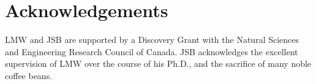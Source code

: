\section*{Acknowledgements}
{LMW and JSB are supported by a Discovery Grant with the Natural
  Sciences and Engineering Research Council of Canada. JSB acknowledges the excellent
  supervision of LMW over the course of his Ph.D., and the sacrifice of many noble 
  coffee beans.}







